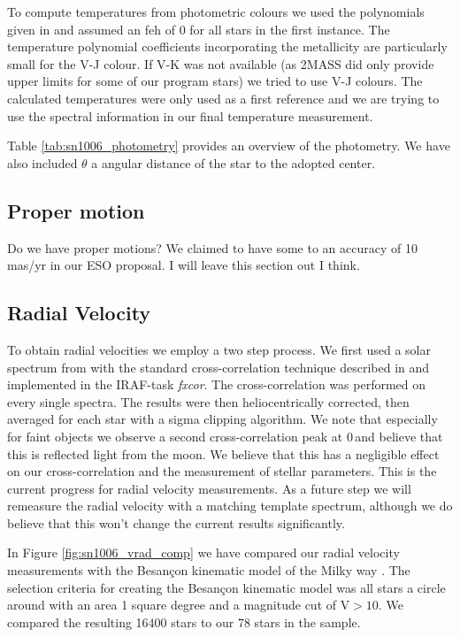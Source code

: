 To compute temperatures from photometric colours we used the polynomials given in  \citep{2010A&A...512A..54C} and assumed an \gls{feh} of 0 for all stars in the first instance. The temperature polynomial coefficients incorporating the metallicity are particularly small for the V-J colour. If V-K was not available (as 2MASS did only provide upper limits for some of our program stars) we tried to use V-J colours. The calculated temperatures were only used as a first reference and we are trying to use the spectral information in our final temperature measurement.

Table \ref{tab:sn1006_photometry} provides an overview of the photometry. We have also included $\theta$ a angular distance of the star to the adopted center.




\subsection{Proper motion}
Do we have proper motions? We claimed to have some to an accuracy of 10 mas/yr in our ESO proposal. I will leave this section out I think. 

\subsection{Radial Velocity}

To obtain radial velocities we employ a two step process. We first used a solar spectrum from \citep{1984sfat.book.....K} with the standard cross-correlation technique described in \citep{1979AJ.....84.1511T} and implemented in the IRAF-task \textit{fxcor}. The cross-correlation was performed on every single spectra. The results were then heliocentrically corrected, then averaged for each star with a sigma clipping algorithm. We note that especially for faint objects we observe a second cross-correlation peak at 0\,\kms and believe that this is reflected light from the moon. We believe that this has a negligible effect on our cross-correlation and the measurement of stellar parameters. This is the current progress for radial velocity measurements. As a future step we will remeasure the radial velocity with a matching template spectrum, although we do believe that this won't change the current results significantly.

In Figure \ref{fig:sn1006_vrad_comp} we have compared our radial velocity measurements with the Besan\c{c}on kinematic model of the Milky way \citep{2003A&A...409..523R}. The selection criteria for creating the  Besan\c{c}on kinematic model was all stars a circle around  with an area 1 square degree and a magnitude cut of $\textrm{V}>10$. We compared the resulting 16400 stars to our 78 stars in the sample. 


